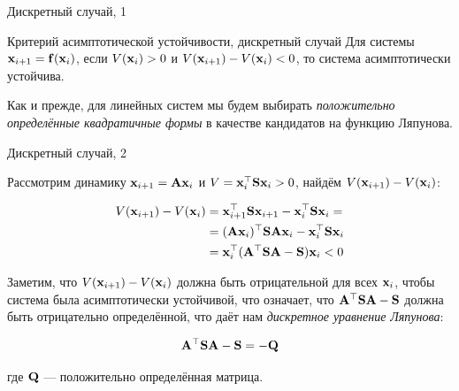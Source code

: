 \documentclass{beamer}
\begin{document}
\begin{frame}{Дискретный случай, 1}
	\begin{flushleft}
		
		\begin{block}{Критерий асимптотической устойчивости, дискретный случай}
			Для системы $\mathbf{x}_{i+1} = \mathbf{f}(\mathbf{x}_i)$, если $V(\mathbf{x}_i) > 0$ и $V(\mathbf{x}_{i+1}) - V(\mathbf{x}_i) < 0$, то система асимптотически устойчива.
		\end{block}
		
		\bigskip 
		
		Как и прежде, для линейных систем мы будем выбирать \emph{положительно определённые квадратичные формы} в качестве кандидатов на функцию Ляпунова.
		
	\end{flushleft}
\end{frame}

\begin{frame}{Дискретный случай, 2}
	\begin{flushleft}
		
		Рассмотрим динамику $\mathbf{x}_{i+1} = \mathbf{A}\mathbf{x}_i$ и $V = \mathbf{x}_i^\top\mathbf{S}\mathbf{x}_i > 0$, найдём $V(\mathbf{x}_{i+1}) - V(\mathbf{x}_i)$:
		
		\begin{align}
			V(\mathbf{x}_{i+1}) - V(\mathbf{x}_i) &= \mathbf{x}_{i+1}^\top\mathbf{S}\mathbf{x}_{i+1}- 
			\mathbf{x}_i^\top\mathbf{S}\mathbf{x}_i =
			\\
			&= (\mathbf{A}\mathbf{x}_i)^\top\mathbf{S}\mathbf{A}\mathbf{x}_i - 
			\mathbf{x}_i^\top\mathbf{S}\mathbf{x}_i
			\\
			&= \mathbf{x}_i^\top(\mathbf{A}^\top\mathbf{S}\mathbf{A} - \mathbf{S})\mathbf{x}_i < 0
		\end{align}
		
		Заметим, что $V(\mathbf{x}_{i+1}) - V(\mathbf{x}_i)$ должна быть отрицательной для всех $\mathbf{x}_i$, чтобы система была асимптотически устойчивой, что означает, что $\mathbf{A}^\top\mathbf{S}\mathbf{A} - \mathbf{S}$ должна быть отрицательно определённой, что даёт нам \emph{дискретное уравнение Ляпунова}:
		
		\begin{equation}
			\mathbf{A}^\top\mathbf{S}\mathbf{A} - \mathbf{S} = -\mathbf{Q}
		\end{equation}
		
		где $\mathbf{Q}$ — положительно определённая матрица.
		
	\end{flushleft}
\end{frame}
\end{document}
